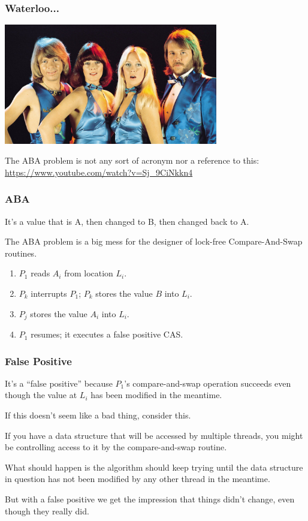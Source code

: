 \begin{frame}
\frametitle{Waterloo...}

\begin{center}
	\includegraphics[width=0.7\textwidth]{images/abba.jpeg}
\end{center}

The ABA problem is not any sort of acronym nor a reference to this: \url{https://www.youtube.com/watch?v=Sj_9CiNkkn4}


\end{frame}



\begin{frame}
\frametitle{ABA}

It's a value that is A, then changed to B, then changed back to A. 

The ABA problem is a big mess for the designer of lock-free Compare-And-Swap routines. 

\begin{enumerate}
	\item $P_{1}$ reads $A_{i}$ from location $L_{i}$.
	\item $P_{k}$ interrupts $P_{1}$; $P_{k}$ stores the value $B$ into $L_{i}$.
	\item $P_{j}$ stores the value $A_{i}$ into $L_{i}$.
	\item $P_{1}$ resumes; it executes a false positive CAS.
\end{enumerate} 


\end{frame}



\begin{frame}
\frametitle{False Positive}

It's a ``false positive'' because $P_{1}$'s compare-and-swap operation succeeds even though the value at $L_{i}$ has been modified in the meantime. 

If this doesn't seem like a bad thing, consider this. 

If you have a data structure that will be accessed by multiple threads, you might be controlling access to it by the compare-and-swap routine. 

What should happen is the algorithm should keep trying until the data structure in question has not been modified by any other thread in the meantime. 

But with a false positive we get the impression that things didn't change, even though they really did.

\end{frame}



